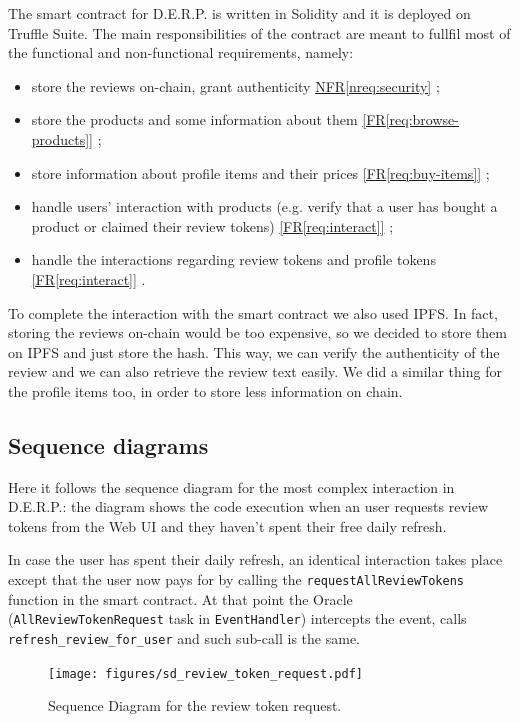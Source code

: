 \documentclass[12pt,a4paper,oneside]{article}
\theoremstyle{definition}
\newcommand{\reqref}[1]{%
	\hyperref[#1]{[FR\ref*{#1}]}%
}
\newcommand{\nreqref}[1]{%
	\hyperref[#1]{NFR\ref*{#1}}%
}
\begin{document}
The smart contract for D.E.R.P. is written in Solidity and it is deployed on Truffle Suite. The main responsibilities of the contract are meant to fullfil most of the functional and non-functional requirements, namely:
\begin{itemize}
	\item store the reviews on-chain, grant authenticity \nreqref{nreq:security};
	\item store the products and some information about them \reqref{req:browse-products};
	\item store information about profile items and their prices \reqref{req:buy-items};
	\item handle users' interaction with products (e.g. verify that a user has bought a product or claimed their review tokens) \reqref{req:interact};
	\item handle the interactions regarding review tokens and profile tokens \reqref{req:interact}.
\end{itemize}

To complete the interaction with the smart contract we also used IPFS. In fact, storing the reviews on-chain would be too expensive, so we decided to store them on IPFS and just store the hash. This way, we can verify the authenticity of the review and we can also retrieve the review text easily. We did a similar thing for the profile items too, in order to store less information on chain. \\





\subsection{Sequence diagrams}

Here it follows the sequence diagram for the most complex interaction in D.E.R.P.: the diagram shows the code execution when an user requests review tokens from the Web UI and they haven't spent their free daily refresh.

In case the user has spent their daily refresh, an identical interaction takes place except that the user now pays for by calling the \texttt{requestAllReviewTokens} function in the smart contract. At that point the Oracle (\texttt{AllReviewTokenRequest} task in \texttt{EventHandler}) intercepts the event, calls \texttt{refresh\_review\_for\_user} and such sub-call is the same.

\begin{figure}[H]
	\centering
	\texttt{[image: figures/sd\_review\_token\_request.pdf]}
	\label{fig:sd-review-token-request}
	\caption{Sequence Diagram for the review token request.}
\end{figure}
\end{document}
